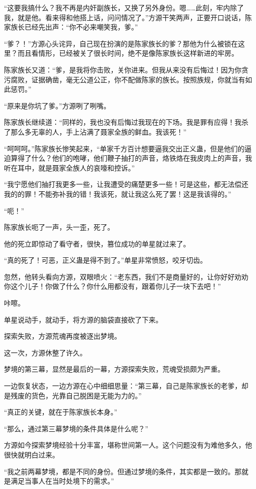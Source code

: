 \begin{this_body}
“这要我搞什么？我不再是内奸副族长，又换了另外身份。嗯……此刻，牢内除了我，就是他。看来得和他搭上话，问问情况了。”方源干笑两声，正要开口说话，陈家族长已经先出声：“你不必来嘲笑我，爹。”

“爹？！”方源心头诧异，自己现在扮演的是陈家族长的爹？那他为什么被锁在这里？而且看情形，已经被关了很长时间，绝不是像陈家族长这样新进的牢房。

陈家族长又道：“爹，是我将你击败，关你进来。但我从来没有后悔过！因为你贪污腐败，证据确凿，毫无公道公正，你不配做陈家的族长。按照族规，你就当有如此惩罚。”

“原来是你坑了爹。”方源咧了咧嘴。

陈家族长继续道：“同样的，我也没有后悔过我现在的下场。我是罪有应得！我杀了那么多无辜的人，手上沾满了聂家全族的鲜血。我该死！”

“呵呵呵。”陈家族长惨笑起来，“单家千方百计想要逼我交出正义蛊，但是他们的逼迫算得了什么？他们的咆哮，他们鞭子抽打的声音，烙铁烙在我皮肉上的声音，我听在耳中，就是聂家全族人的哀嚎和控诉。”

“我宁愿他们抽打我更多一些，让我遭受的痛楚更多一些！可是这些，都无法偿还我的的罪！不能弥补我的错！我该死，就让我这么死了罢！这是我该得的。”

“呃！”

陈家族长呃了一声，头一歪，死了。

他的死立即惊动了看守者，很快，篡位成功的单星就过来了。

“真的死了！可恶，正义蛊是得不到了。”单星非常愤怒，咬牙切齿。

忽然，他转头看向方源，双眼喷火：“老东西，我们不是商量好的，让你好好劝劝你这个儿子！你做了什么？你什么用都没有，跟着你儿子一块下去吧！”

咔嚓。

单星说动手，就动手，将方源的脑袋直接砍了下来。

探索失败，方源荒魂再度被逐出梦境。

这一次，方源休整了许久。

梦境的第三幕，显然是最后的一幕，方源探索失败，荒魂受损颇为严重。

一边恢复状态，一边方源在心中细细思量：“第三幕，自己是陈家族长的老爹，却是残废的货色，光靠自己脱困是无能为力的。”

“真正的关键，就在于陈家族长本身。”

“那么，通过第三幕梦境的条件具体是什么呢？”

方源如今探索梦境经验十分丰富，堪称世间第一人。这个问题没有为难他多久，他很快就明白过来。

“我之前两幕梦境，都是不同的身份。但通过梦境的条件，其实都是一致的。那就是满足当事人在当时处境下的需求。”


\end{this_body}
